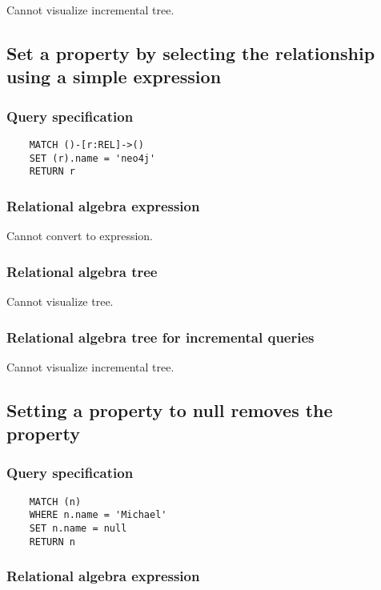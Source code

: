 	Cannot visualize incremental tree.
	\subsection{Set a property by selecting the relationship using a simple expression}

	\subsubsection*{Query specification}

	\begin{lstlisting}
	MATCH ()-[r:REL]->()
	SET (r).name = 'neo4j'
	RETURN r
	\end{lstlisting}


	\subsubsection*{Relational algebra expression}

	Cannot convert to expression.

	\subsubsection*{Relational algebra tree}

	Cannot visualize tree.

	\subsubsection*{Relational algebra tree for incremental queries}

	Cannot visualize incremental tree.
	\subsection{Setting a property to null removes the property}

	\subsubsection*{Query specification}

	\begin{lstlisting}
	MATCH (n)
	WHERE n.name = 'Michael'
	SET n.name = null
	RETURN n
	\end{lstlisting}


	\subsubsection*{Relational algebra expression}

